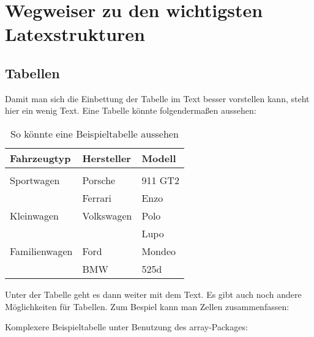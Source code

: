 \chapter {Wegweiser zu den wichtigsten Latexstrukturen}\label{text:main}

\section {Tabellen}

Damit man sich die Einbettung der Tabelle im Text besser vorstellen kann, steht hier ein wenig Text. Eine Tabelle könnte folgendermaßen aussehen:

	\begin{table}[h]
		\begin{center} %
			\caption[Kurzfassung f. Inhaltsverz.]{So könnte eine Beispieltabelle aussehen} \vspace{2ex} %
			
			\begin{tabular}{lll}        %
	        \hline                      %
			\textbf{Fahrzeugtyp} & \textbf{Hersteller}& \textbf{Modell}\\
			\hline                      %
			  &\\
			  Sportwagen & Porsche & 911 GT2 \\
			   & Ferrari & Enzo \\
			  Kleinwagen & Volkswagen & Polo \\
			   & & Lupo \\
			  Familienwagen & Ford & Mondeo \\
			   & BMW & 525d \\
			  \hline
			 \end{tabular}
			\label{tbl:Autos}		%
		\end{center}
	\end{table}

Unter der Tabelle geht es dann weiter mit dem Text. Es gibt auch noch andere Möglichkeiten für Tabellen. Zum Bespiel kann man Zellen zusammenfassen:

Komplexere Beispieltabelle unter Benutzung des array-Packages:


